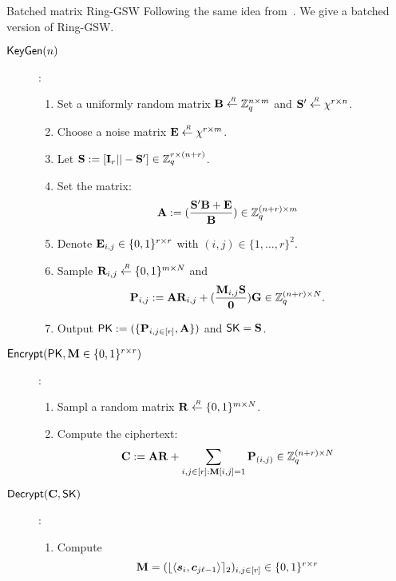 \begin{subsection}{Batched matrix Ring-GSW}
  Following the same idea from~\cite{DBLP:conf/pkc/HiromasaAO15}. We give a batched version of Ring-GSW.
  \begin{description}
  \item[${\mathsf{KeyGen}}(n)$]:
    \begin{enumerate}
    \item Set a uniformly random matrix $\mathbf{B} \stackrel{{\scriptscriptstyle \mkern4mu R}}{\gets} \mathbb{Z}_q^{n \times m}$ and $\mathbf{S'} \stackrel{{\scriptscriptstyle \mkern4mu R}}{\gets} \chi^{r \times n}$.
    \item Choose a noise matrix $\mathbf{E} \stackrel{{\scriptscriptstyle \mkern4mu R}}{\gets} \chi^{r \times m}$.
    \item Let $\mathbf{S}:= [\mathbf{I}_r || - \mathbf{S}'] \in \mathbb{Z}_q^{r \times (n+r)}$.
    \item Set the matrix:
      \begin{align*}
        \mathbf{A} &:= (\frac{\mathbf{S}'\mathbf{B} + \mathbf{E}}{\mathbf{B}}) \in \mathbb{Z}_q^{(n+r) \times m}
      \end{align*}
    \item Denote $\mathbf{E}_{i,j} \in \{0, 1\}^{r\times r}$ with $(i,j) \in \{1, \dots ,r\}^2$.
    \item Sample $\mathbf{R}_{i,j} \stackrel{{\scriptscriptstyle \mkern4mu R}}{\gets} \{0,1\}^{m \times N}$ and 
      \begin{align*}
        \mathbf{P}_{i,j} &:= \mathbf{A} \mathbf{R}_{i,j} + (\frac{\mathbf{M}_{i,j}\mathbf{S}}{\mathbf{0}}) \mathbf{G} \in \mathbb{Z}_q^{(n+r) \times N}.
      \end{align*}
    \item Output $\mathsf{PK} := (\{\mathbf{P}_{i,j \in [r]}, \mathbf{A}\})$ and $\mathsf{SK} = \mathbf{S}$.
    \end{enumerate}
    
  \item[${\mathsf{Encrypt}}(\mathsf{PK}, \mathbf{M} \in \{0,1\}^{r \times r})$] :
    \begin{enumerate}
    \item Sampl a random matrix $\mathbf{R} \stackrel{{\scriptscriptstyle \mkern4mu R}}{\gets} \{0,1\}^{m \times N}$.
    \item Compute the ciphertext:
      \begin{align*}
        \mathbf{C} &:= \mathbf{A} \mathbf{R} + \sum_{i,j \in [r] : \mathbf{M}[i,j] = 1} \mathbf{P}_{(i,j)} \in \mathbb{Z}_q^{(n+r) \times N}
      \end{align*}
    \end{enumerate}
    
  \item[${\mathsf{Decrypt}}(\mathbf{C}, \mathsf{SK})$]:
    \begin{enumerate}
    \item Compute
      \begin{align*}
        \mat{M} &=(\round{\langle \vec{s}_i, \vec{c}_{j\ell-1} \rangle}_2)_{i,j \in [r]} \in \{0,1\}^{r \times r}
      \end{align*}
    \end{enumerate}
  \end{description}
\end{subsection}
